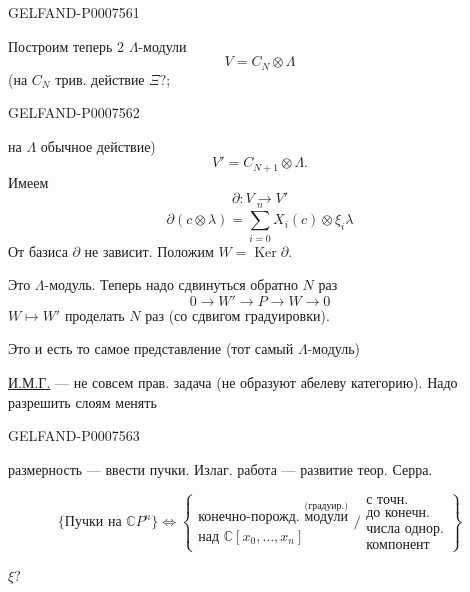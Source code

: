 \begin{GelfandAdjacentEvidence}{GELFAND-P000756}{1}

Построим теперь 2 \(\Lambda\)-модули
\begin{equation*}
V=C_N\otimes\Lambda
\tag{18}
\end{equation*}
(на \(C_N\) трив. действие \(\Xi?\);
\end{GelfandAdjacentEvidence}
\begin{GelfandAdjacentEvidence}{GELFAND-P000756}{2}

на \(\Lambda\) обычное действие)
\begin{equation*}
V'=C_{N+1}\otimes\Lambda.
\tag{\(18'\)}
\end{equation*}
Имеем
\begin{equation*}
\partial:V\longrightarrow V'
\tag{19}
\end{equation*}
\begin{equation*}
\partial(c\otimes\lambda)=\sum_{i=0}^n X_i(c)\otimes\xi_i\lambda
\tag{20}
\end{equation*}
От базиса \(\partial\) не зависит.
Положим \(W=\operatorname{Ker}\partial\).

Это \(\Lambda\)-модуль. Теперь надо сдвинуться обратно \(N\) раз
\[
0\longrightarrow W'\longrightarrow P\longrightarrow W\longrightarrow0
\]
\(W\longmapsto W'\) проделать \(N\) раз
(со сдвигом градуировки).

Это и есть то самое представление (тот самый \(\Lambda\)-модуль)

\underline{И.М.Г.}\quad{}
--- не совсем прав. задача (не образуют абелеву категорию).
Надо разрешить слоям менять
\end{GelfandAdjacentEvidence}
\begin{GelfandAdjacentEvidence}{GELFAND-P000756}{3}

размерность --- ввести пучки.
Излаг. работа — развитие теор. Серра.

\[
\{\text{Пучки на }\mathbb CP^n\}\Leftrightarrow
\left\{
\begin{array}{l}
\text{конечно-порожд. }\overset{\text{(градуир.)}}{\text{модули}}\\
\text{над }\mathbb C[x_0,\ldots,x_n]
\end{array}
\Big/
\begin{array}{l}
\text{с точн.}\\
\text{до конечн.}\\
\text{числа однор.}\\
\text{компонент}
\end{array}
\right\}
\]

\(\xi?\)
\end{GelfandAdjacentEvidence}
